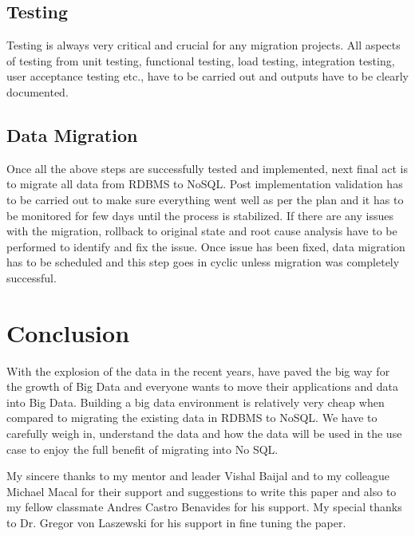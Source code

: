 \documentclass[sigconf]{acmart}
\begin{document}
\subsection{Testing} 

Testing is always very critical and crucial for any migration projects. All aspects of testing from unit testing, functional testing, load testing, integration testing, user acceptance testing etc., have to be carried out and outputs have to be clearly documented. 

\subsection{Data Migration} 

Once all the above steps are successfully tested and implemented, next final act is to migrate all data from RDBMS to NoSQL. Post implementation validation has to be carried out to make sure everything went well as per the plan and it has to be monitored for few days until the process is stabilized. If there are any issues with the migration, rollback to original state and root cause analysis have to be performed to identify and fix the issue. Once issue has been fixed, data migration has to be scheduled and this step goes in cyclic unless migration was completely successful. 

\section{Conclusion}

With the explosion of the data in the recent years, have paved the big way for the growth of Big Data and everyone wants to move their applications and data into Big Data. Building a big data environment is relatively very cheap when compared to migrating the existing data in RDBMS to NoSQL. We have to carefully weigh in, understand the data and how the data will be used in the use case to enjoy the full benefit of migrating into No SQL.

\begin{acks}

My sincere thanks to my mentor and leader Vishal Baijal and to my colleague Michael Macal for their support and suggestions to write this paper and also to my fellow classmate Andres Castro Benavides for his support. My special thanks to Dr. Gregor von Laszewski for his support in fine tuning the paper.

\end{acks}


 


\end{document}

